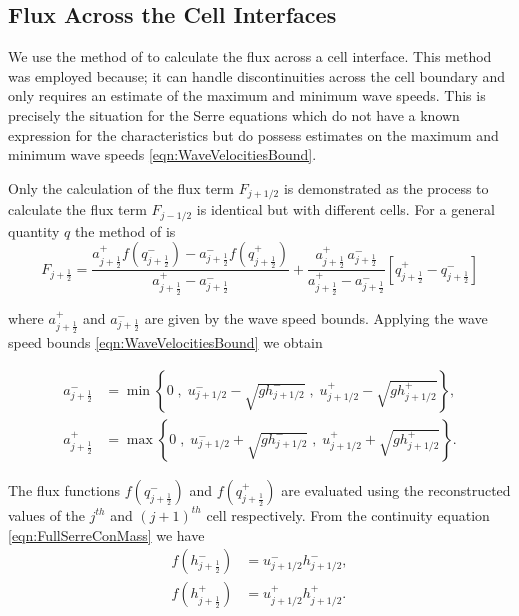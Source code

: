 \subsection{Flux Across the Cell Interfaces}

We use the method of \citet{Kurganov-etal-2001-707} to calculate the flux across a cell interface. This method was employed because; it can handle discontinuities across the cell boundary and only requires an estimate of the maximum and minimum wave speeds. This is precisely the situation for the Serre equations which do not have a known expression for the characteristics but do possess estimates on the maximum and minimum wave speeds \eqref{eqn:WaveVelocitiesBound}.

Only the calculation of the flux term $F_{j+1/2}$ is demonstrated as the process to calculate the flux term $F_{j-1/2}$ is identical but with different cells. For a general quantity $q$ the method of \citet{Kurganov-etal-2001-707} is
\begin{equation}\label{eqn:HLL_flux}
F_{j+\frac{1}{2}} = \dfrac{a^+_{j+\frac{1}{2}} f\left(q^-_{j+\frac{1}{2}}\right) - a^-_{j+\frac{1}{2}} f\left(q^+_{j+\frac{1}{2}}\right)}{a^+_{j+\frac{1}{2}} - a^-_{j+\frac{1}{2}}}  + \dfrac{a^+_{j+\frac{1}{2}} \, a^-_{j+\frac{1}{2}}}{a^+_{j+\frac{1}{2}} - a^-_{j+\frac{1}{2}}} \left [ q^+_{j+\frac{1}{2}} - q^-_{j+\frac{1}{2}} \right ]
\end{equation}

where $a^+_{j+\frac{1}{2}}$ and $a^-_{j+\frac{1}{2}}$ are given by the wave speed bounds. Applying the wave speed bounds \eqref{eqn:WaveVelocitiesBound} we obtain

\begin{align}
a^-_{j+\frac{1}{2}} &= \min\left\lbrace 0\;,\;  u^-_{j + 1/2} - \sqrt{g h^-_{j + 1/2}}  \;,\;u^+_{j + 1/2} - \sqrt{g h^+_{j + 1/2}} \right\rbrace  ,\\
a^+_{j+\frac{1}{2}} &= \max\left\lbrace 0 \;,\;  u^-_{j + 1/2} + \sqrt{g h^-_{j + 1/2}}  \;,\;u^+_{j + 1/2} + \sqrt{g h^+_{j + 1/2}} \right\rbrace .
\label{eqn:WaveSpeedBoundsFluxApprox}
\end{align}

The flux functions $f(q^-_{j+\frac{1}{2}})$ and $f(q^+_{j+\frac{1}{2}})$ are evaluated using the reconstructed values of the $j^{th}$ and $(j+1)^{th}$ cell respectively. From the continuity equation \eqref{eqn:FullSerreConMass} we have
\begin{align*}
f\left(h^-_{j+\frac{1}{2}}\right) &= u^-_{j + 1/2}  h^-_{j + 1/2}   ,\\
f\left(h^+_{j+\frac{1}{2}}\right) &= u^+_{j + 1/2}  h^+_{j + 1/2}  .
\end{align*}

